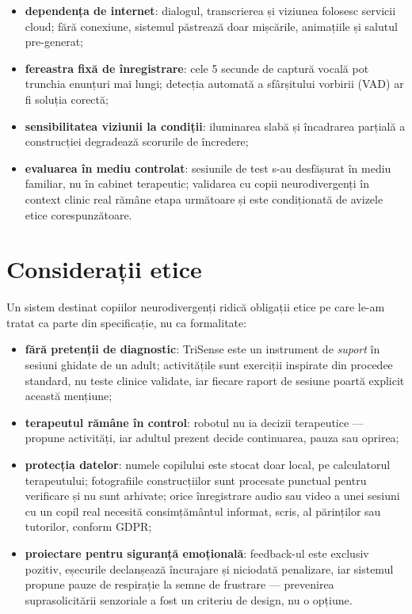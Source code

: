 \begin{itemize}
    \item \textbf{dependența de internet}: dialogul, transcrierea și viziunea folosesc servicii cloud; fără conexiune, sistemul păstrează doar mișcările, animațiile și salutul pre-generat;
    \item \textbf{fereastra fixă de înregistrare}: cele 5 secunde de captură vocală pot trunchia enunțuri mai lungi; detecția automată a sfârșitului vorbirii (VAD) ar fi soluția corectă;
    \item \textbf{sensibilitatea viziunii la condiții}: iluminarea slabă și încadrarea parțială a construcției degradează scorurile de încredere;
    \item \textbf{evaluarea în mediu controlat}: sesiunile de test s-au desfășurat în mediu familiar, nu în cabinet terapeutic; validarea cu copii neurodivergenți în context clinic real rămâne etapa următoare și este condiționată de avizele etice corespunzătoare.
\end{itemize}

\section{Considerații etice}

Un sistem destinat copiilor neurodivergenți ridică obligații etice pe care le-am tratat ca parte din specificație, nu ca formalitate:

\begin{itemize}
    \item \textbf{fără pretenții de diagnostic}: TriSense este un instrument de \emph{suport} în sesiuni ghidate de un adult; activitățile sunt exerciții inspirate din procedee standard, nu teste clinice validate, iar fiecare raport de sesiune poartă explicit această mențiune;
    \item \textbf{terapeutul rămâne în control}: robotul nu ia decizii terapeutice — propune activități, iar adultul prezent decide continuarea, pauza sau oprirea;
    \item \textbf{protecția datelor}: numele copilului este stocat doar local, pe calculatorul terapeutului; fotografiile construcțiilor sunt procesate punctual pentru verificare și nu sunt arhivate; orice înregistrare audio sau video a unei sesiuni cu un copil real necesită consimțământul informat, scris, al părinților sau tutorilor, conform GDPR;
    \item \textbf{proiectare pentru siguranță emoțională}: feedback-ul este exclusiv pozitiv, eșecurile declanșează încurajare și niciodată penalizare, iar sistemul propune pauze de respirație la semne de frustrare — prevenirea suprasolicitării senzoriale a fost un criteriu de design, nu o opțiune.
\end{itemize}
